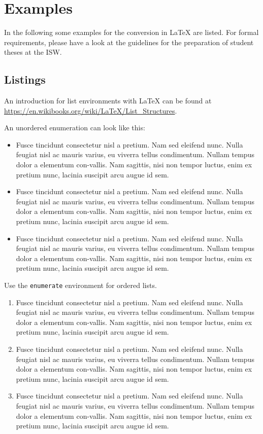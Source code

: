 \chapter{Examples}

In the following some examples for the conversion in \LaTeX{} are listed. For formal requirements, please have a look at the guidelines for the preparation of student theses at the \ac{ISW}.

\section{Listings}

An introduction for list environments with \LaTeX{} can be found at \url{https://en.wikibooks.org/wiki/LaTeX/List_Structures}.

An unordered enumeration can look like this:

\begin{itemize}
    \item Fusce tincidunt consectetur nisl a pretium. Nam sed eleifend nunc. Nulla feugiat nisl ac mauris varius, eu viverra tellus condimentum. Nullam tempus dolor a elementum con-vallis. Nam sagittis, nisi non tempor luctus, enim ex pretium nunc, lacinia suscipit arcu augue id sem.
    \item Fusce tincidunt consectetur nisl a pretium. Nam sed eleifend nunc. Nulla feugiat nisl ac mauris varius, eu viverra tellus condimentum. Nullam tempus dolor a elementum con-vallis. Nam sagittis, nisi non tempor luctus, enim ex pretium nunc, lacinia suscipit arcu augue id sem.
    \item Fusce tincidunt consectetur nisl a pretium. Nam sed eleifend nunc. Nulla feugiat nisl ac mauris varius, eu viverra tellus condimentum. Nullam tempus dolor a elementum con-vallis. Nam sagittis, nisi non tempor luctus, enim ex pretium nunc, lacinia suscipit arcu augue id sem.
\end{itemize}

Use the \texttt{enumerate} environment for ordered lists.

\begin{enumerate}
    \item Fusce tincidunt consectetur nisl a pretium. Nam sed eleifend nunc. Nulla feugiat nisl ac mauris varius, eu viverra tellus condimentum. Nullam tempus dolor a elementum con-vallis. Nam sagittis, nisi non tempor luctus, enim ex pretium nunc, lacinia suscipit arcu augue id sem.
    \item Fusce tincidunt consectetur nisl a pretium. Nam sed eleifend nunc. Nulla feugiat nisl ac mauris varius, eu viverra tellus condimentum. Nullam tempus dolor a elementum con-vallis. Nam sagittis, nisi non tempor luctus, enim ex pretium nunc, lacinia suscipit arcu augue id sem.
    \item Fusce tincidunt consectetur nisl a pretium. Nam sed eleifend nunc. Nulla feugiat nisl ac mauris varius, eu viverra tellus condimentum. Nullam tempus dolor a elementum con-vallis. Nam sagittis, nisi non tempor luctus, enim ex pretium nunc, lacinia suscipit arcu augue id sem.
\end{enumerate}

